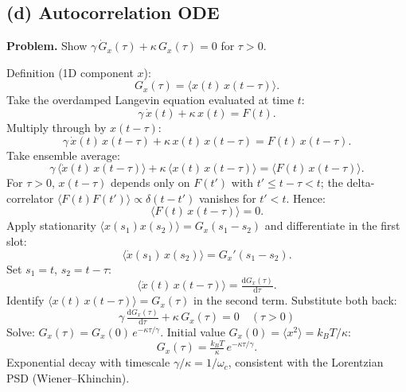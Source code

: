 \documentclass[11pt]{article}
\newcommand{\de}{\mathrm{d}}
\begin{document}
\subsection*{(d) Autocorrelation ODE}

\textbf{Problem.} Show $\gamma\,\dot G_x(\tau) + \kappa\,G_x(\tau) = 0$ for $\tau>0$.

Definition (1D component $x$):
\[
G_x(\tau) = \langle x(t)\,x(t-\tau)\rangle.
\]
Take the overdamped Langevin equation evaluated at time $t$:
\[
\gamma\,\dot x(t) + \kappa\,x(t) = F(t).
\]
Multiply through by $x(t-\tau)$:
\[
\gamma\,\dot x(t)\,x(t-\tau) + \kappa\,x(t)\,x(t-\tau) = F(t)\,x(t-\tau).
\]
Take ensemble average:
\[
\gamma\,\langle\dot x(t)\,x(t-\tau)\rangle + \kappa\,\langle x(t)\,x(t-\tau)\rangle = \langle F(t)\,x(t-\tau)\rangle.
\]
For $\tau>0$, $x(t-\tau)$ depends only on $F(t')$ with $t'\le t-\tau<t$; the delta-correlator $\langle F(t)F(t')\rangle\propto\delta(t-t')$ vanishes for $t'<t$. Hence:
\[
\langle F(t)\,x(t-\tau)\rangle = 0.
\]
Apply stationarity $\langle x(s_1)x(s_2)\rangle = G_x(s_1-s_2)$ and differentiate in the first slot:
\[
\langle \dot x(s_1)\,x(s_2)\rangle = G_x'(s_1-s_2).
\]
Set $s_1=t$, $s_2=t-\tau$:
\[
\langle\dot x(t)\,x(t-\tau)\rangle = \tfrac{\de G_x(\tau)}{\de\tau}.
\]
Identify $\langle x(t)\,x(t-\tau)\rangle = G_x(\tau)$ in the second term. Substitute both back:
\[
\boxed{\;\gamma\,\tfrac{\de G_x(\tau)}{\de\tau} + \kappa\,G_x(\tau) = 0\quad(\tau>0)\;}
\]
Solve: $G_x(\tau) = G_x(0)\,e^{-\kappa\tau/\gamma}$. Initial value $G_x(0) = \langle x^2\rangle = k_BT/\kappa$:
\[
G_x(\tau) = \tfrac{k_BT}{\kappa}\,e^{-\kappa\tau/\gamma}.
\]
Exponential decay with timescale $\gamma/\kappa = 1/\omega_c$, consistent with the Lorentzian PSD (Wiener--Khinchin).
\end{document}

